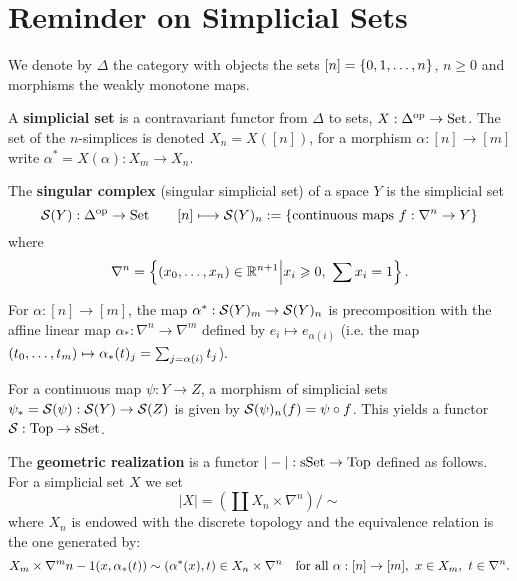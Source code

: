 \section{Reminder on Simplicial Sets}\label{section:reminder-on-sset}

We denote by $\Delta$ the category with objects the sets $[n]=\cb{0,1,\dots,n}$, $n\geq 0$ and morphisms the weakly monotone maps.

A \textbf{simplicial set} is a contravariant functor from $\Delta$ to sets, $X:\Delta^\op \to\Set$. The set of the $n$-simplices is denoted $X_n=X([n])$, for a morphism $\alpha:[n]\to[m]$ write $\alpha^*=X(\alpha):X_m\to X_n$.

The \textbf{singular complex} (singular simplicial set) of a space $Y$ is the simplicial set $$\S(Y):\Delta^\op \to\Set \qquad [n] \longmapsto \S(Y)_n :=\left\{\text{continuous maps }f:\nabla^n \to Y\right\}$$
where 
$$\nabla^n=\left\{(\xso)\in\R^{n+1}\middle| x_i\geq0,\ \sum x_i=1\right\}.$$

For $\alpha: [n]\to [m]$, the map $\alpha^*:\S(Y)_m\to\S(Y)_n$ is precomposition with the affine linear map $\alpha_*:\nabla^n\to\nabla^m$ defined by $e_i\mapsto e_{\alpha(i)}$ (i.e. the map $(\nno{t}{m})\mapsto\alpha_*(t)_j=\sum_{j=\alpha(i)}t_j$).

For a continuous map $\psi:Y\to Z$, a morphism of simplicial sets $\psi_*=\S(\psi):\S(Y)\to\S(Z)$ is given by $\S(\psi)_n(f)=\psi\circ f$. This yields a functor $\S:\Top\to\sSet$.

The \textbf{geometric realization} is a functor $|-|:\sSet\to\Top$ defined as follows. For a simplicial set $X$ we set
\[|X|=\left(\coprod X_n\times\nabla^n\right)/\sim\]
where $X_n$ is endowed with the discrete topology and the equivalence relation is the one generated by:\normalmarginpar{}
\[X_m\times\nabla^m\cont(x,\alpha_*(t))\sim(\alpha^*(x),t)\in X_n\times\nabla^n\quad\text{for all }\alpha:[n]\to[m],\ x\in X_m,\ t\in\nabla^n.\]

\reversemarginpar

